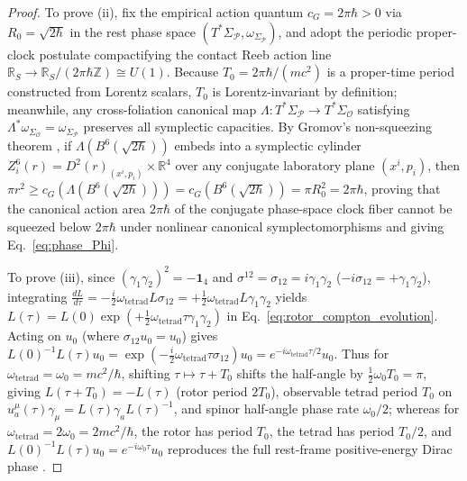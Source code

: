 \documentclass[11pt, a4paper]{article}
\theoremstyle{definition}
\begin{document}
\begin{proof}
To prove (ii), fix the empirical action quantum $c_G = 2\pi\hbar > 0$ via $R_0 = \sqrt{2\hbar}$ in the rest phase space $(T^*\Sigma_{\mathcal{P}}, \omega_{\Sigma_{\mathcal{P}}})$, and adopt the periodic proper-clock postulate compactifying the contact Reeb action line $\mathbb{R}_S \to \mathbb{R}_S / (2\pi\hbar\mathbb{Z}) \cong U(1)$. Because $T_0 = 2\pi\hbar / (mc^2)$ is a proper-time period constructed from Lorentz scalars, $T_0$ is Lorentz-invariant by definition; meanwhile, any cross-foliation canonical map $\Lambda: T^*\Sigma_{\mathcal{P}} \to T^*\Sigma_{\mathcal{O}}$ satisfying $\Lambda^* \omega_{\Sigma_{\mathcal{O}}} = \omega_{\Sigma_{\mathcal{P}}}$ preserves all symplectic capacities. By Gromov's non-squeezing theorem \cite{Gromov1985}, if $\Lambda(B^6(\sqrt{2\hbar}))$ embeds into a symplectic cylinder $Z^{6}_i(r) = D^2(r)_{(x^i, p_i)} \times \mathbb{R}^4$ over any conjugate laboratory plane $(x^i, p_i)$, then $\pi r^2 \ge c_G(\Lambda(B^6(\sqrt{2\hbar}))) = c_G(B^6(\sqrt{2\hbar})) = \pi R_0^2 = 2\pi\hbar$, proving that the canonical action area $2\pi\hbar$ of the conjugate phase-space clock fiber cannot be squeezed below $2\pi\hbar$ under nonlinear canonical symplectomorphisms and giving Eq.~\eqref{eq:phase_Phi}.

To prove (iii), since $(\gamma_1\gamma_2)^2 = -\mathbf{1}_4$ and $\sigma^{12} = \sigma_{12} = i\gamma_1\gamma_2$ ($-i\sigma_{12} = +\gamma_1\gamma_2$), integrating $\frac{dL}{d\tau} = -\frac{i}{2}\omega_{\text{tetrad}} L\sigma_{12} = +\frac{1}{2}\omega_{\text{tetrad}} L\gamma_1\gamma_2$ yields $L(\tau) = L(0)\exp(+\frac{1}{2}\omega_{\text{tetrad}}\tau\gamma_1\gamma_2)$ in Eq.~\eqref{eq:rotor_compton_evolution}. Acting on $u_0$ (where $\sigma_{12}u_0 = u_0$) gives $L(0)^{-1}L(\tau)u_0 = \exp(-\frac{i}{2}\omega_{\text{tetrad}}\tau\sigma_{12})u_0 = e^{-i\omega_{\text{tetrad}}\tau/2}u_0$. Thus for $\omega_{\text{tetrad}} = \omega_0 = mc^2/\hbar$, shifting $\tau \mapsto \tau + T_0$ shifts the half-angle by $\frac{1}{2}\omega_0 T_0 = \pi$, giving $L(\tau + T_0) = -L(\tau)$ (rotor period $2T_0$), observable tetrad period $T_0$ on $u_a^\mu(\tau)\gamma_\mu = L(\tau)\gamma_a L(\tau)^{-1}$, and spinor half-angle phase rate $\omega_0/2$; whereas for $\omega_{\text{tetrad}} = 2\omega_0 = 2mc^2/\hbar$, the rotor has period $T_0$, the tetrad has period $T_0/2$, and $L(0)^{-1}L(\tau)u_0 = e^{-i\omega_0\tau}u_0$ reproduces the full rest-frame positive-energy Dirac phase \cite{Hestenes1990}.
\end{proof}
\end{document}
